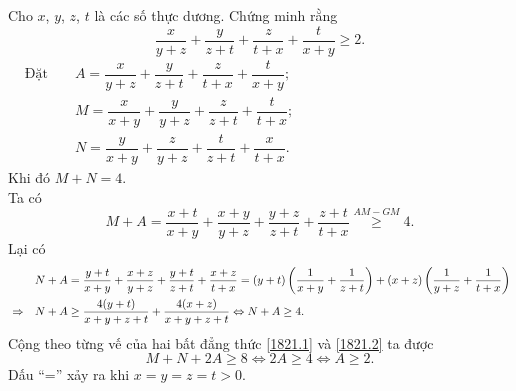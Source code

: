 \begin{ex}%
 Cho $x$, $y$, $z$, $t$ là các số thực dương. Chứng minh rằng
 $$\dfrac{x}{y+z} + \dfrac{y}{z+t} + \dfrac{z}{t+x} + \dfrac{t}{x+y} \geq 2.$$
 \loigiai
  {
  $\begin{aligned}
  &\text{Đặt }& &A = \dfrac{x}{y+z} + \dfrac{y}{z+t} + \dfrac{z}{t+x} + \dfrac{t}{x+y};\\
  & & &M = \dfrac{x}{x+y} + \dfrac{y}{y+z} + \dfrac{z}{z+t} + \dfrac{t}{t+x};\\
  & & &N = \dfrac{y}{x+y} + \dfrac{z}{y+z} + \dfrac{t}{z+t} + \dfrac{x}{t+x}.
  \end{aligned}$\\
  Khi đó $M+N=4$.\\
  Ta có
  \begin{equation}\label{1821.1}
   M + A = \dfrac{x+t}{x+y} + \dfrac{x+y}{y+z} + \dfrac{y+z}{z+t} + \dfrac{z+t}{t+x} \mathop \geq \limits^{AM-GM} 4.
  \end{equation}
  Lại có
  \begin{align}
   & & &N + A = \dfrac{y+t}{x+y} + \dfrac{x+z}{y+z} + \dfrac{y+t}{z+t} + \dfrac{x+z}{t+x} = (y+t)\left(\dfrac{1}{x+y} + \dfrac{1}{z+t}\right) + (x+z)\left(\dfrac{1}{y+z} + \dfrac{1}{t+x}\right) \notag \\ 
   &\Rightarrow & &N+A \geq \dfrac{4(y+t)}{x+y+z+t} + \dfrac{4(x+z)}{x+y+z+t} \Leftrightarrow N+A \geq 4. \label{1821.2}
  \end{align}
  Cộng theo từng vế của hai bất đẳng thức \eqref{1821.1} và \eqref{1821.2} ta được
  $$M + N + 2A \geq 8 \Leftrightarrow 2A \geq 4 \Leftrightarrow A \geq 2.$$
  Dấu ``='' xảy ra khi $x=y=z=t>0$.
  }
\end{ex}

